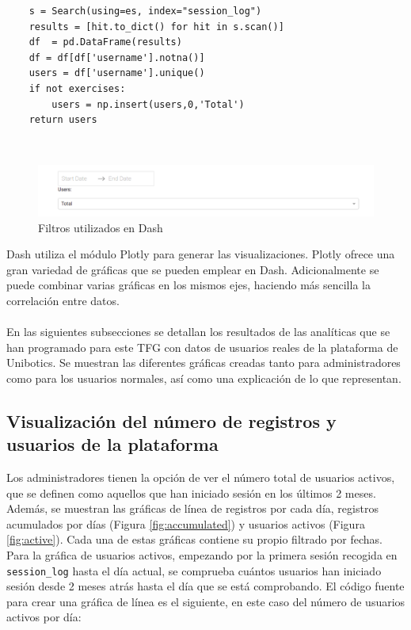 \begin{lstlisting}
	s = Search(using=es, index="session_log")
    results = [hit.to_dict() for hit in s.scan()]
    df  = pd.DataFrame(results)
    df = df[df['username'].notna()]
    users = df['username'].unique()
    if not exercises:
        users = np.insert(users,0,'Total')
    return users
\end{lstlisting}
\\
\begin{figure}[H]
    \centering
    \includegraphics[width=16cm, keepaspectratio]{img/filtros.png}
    \caption{Filtros utilizados en Dash}
    \label{fig:filtros}
\end{figure}
\newpage
Dash utiliza el módulo Plotly para generar las visualizaciones. Plotly ofrece una gran variedad de gráficas que se pueden emplear en Dash. Adicionalmente se puede combinar varias gráficas en los mismos ejes, haciendo más sencilla la correlación entre datos.\\

\\
En las siguientes subsecciones se detallan los resultados de las analíticas que se han programado para este TFG con datos de usuarios reales de la plataforma de Unibotics. Se muestran las diferentes gráficas creadas tanto para administradores como para los usuarios normales, así como una explicación de lo que representan.
\subsection{Visualización del número de registros y usuarios de la plataforma}
Los administradores tienen la opción de ver el número total de usuarios activos, que se definen como aquellos que han iniciado sesión en los últimos 2 meses. Además, se muestran las gráficas de línea de registros por cada día, registros acumulados por días (Figura \ref{fig:accumulated}) y usuarios activos (Figura \ref{fig:active}). Cada una de estas gráficas contiene su propio filtrado por fechas.\\

Para la gráfica de usuarios activos, empezando por la primera sesión recogida en \texttt{session\_log} hasta el día actual, se comprueba cuántos usuarios han iniciado sesión desde 2 meses atrás hasta el día que se está comprobando. El código fuente para crear una gráfica de línea es el siguiente, en este caso del número de usuarios activos por día:

